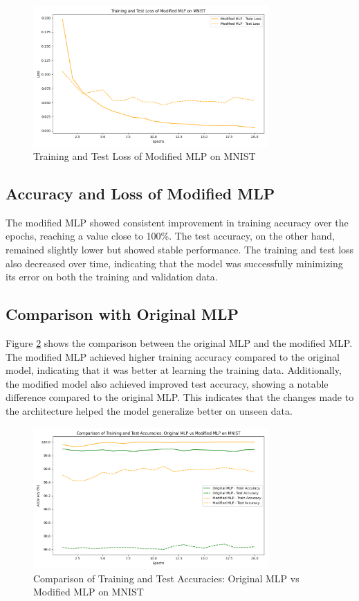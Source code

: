\documentclass[10pt,letter,notitlepage]{article}
\begin{document}
\begin{center}
\begin{figure}[h]
    \centering
    \includegraphics[width=0.8\textwidth]{modified_mlp_loss.png}
    \caption{Training and Test Loss of Modified MLP on MNIST}
    \label{fig:modified_mlp_loss}
\end{figure}

\subsection{Accuracy and Loss of Modified MLP}
The modified MLP showed consistent improvement in training accuracy over the epochs, reaching a value close to 100\%. The test accuracy, on the other hand, remained slightly lower but showed stable performance. The training and test loss also decreased over time, indicating that the model was successfully minimizing its error on both the training and validation data.

\subsection{Comparison with Original MLP}
Figure \ref{fig:mlp_comparison} shows the comparison between the original MLP and the modified MLP. The modified MLP achieved higher training accuracy compared to the original model, indicating that it was better at learning the training data. Additionally, the modified model also achieved improved test accuracy, showing a notable difference compared to the original MLP. This indicates that the changes made to the architecture helped the model generalize better on unseen data.

\begin{figure}[H]
    \centering
    \includegraphics[width=0.8\textwidth]{mlp_vs_modified_mlp_accuracy.png}
    \caption{Comparison of Training and Test Accuracies: Original MLP vs Modified MLP on MNIST}
    \label{fig:mlp_comparison}
\end{figure}


\end{center}
\end{document}
